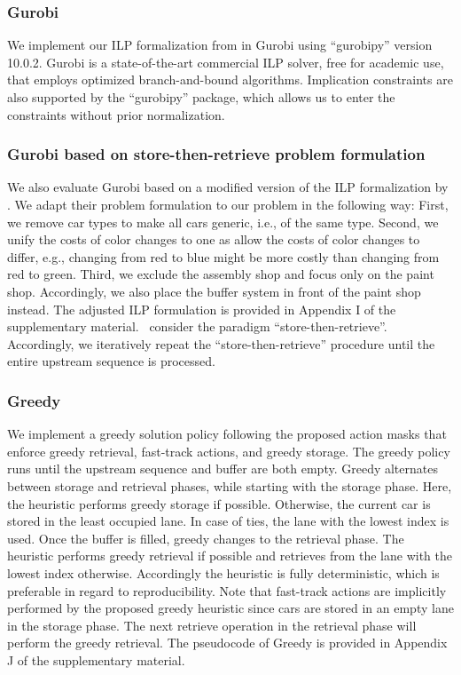 \documentclass[11pt]{elsarticle}
\begin{document}
\subsubsection*{Gurobi}

We implement our ILP formalization from  in Gurobi using ``gurobipy'' version 10.0.2.
Gurobi is a state-of-the-art commercial ILP solver, free for academic use, that employs optimized branch-and-bound algorithms. Implication constraints are also supported by the ``gurobipy'' package, which allows us to enter the constraints without prior normalization.


\subsubsection*{Gurobi based on store-then-retrieve problem formulation \citep{wu2021mathematical}}

We also evaluate Gurobi based on a modified version of the ILP formalization by \citet{wu2021mathematical}.  
We adapt their problem formulation to our problem in the following way: First, we remove car types to make all cars generic, i.e., of the same type. Second, we unify the costs of color changes to one as \citet{wu2021mathematical} allow the costs of color changes to differ, e.g., changing from red to blue might be more costly than changing from red to green. Third, we exclude the assembly shop and focus only on the paint shop.
Accordingly, we also place the buffer system in front of the paint shop instead. 
The adjusted ILP formulation is provided in Appendix I of the supplementary material. \citeauthor{wu2021mathematical}~consider the paradigm ``store-then-retrieve''. Accordingly, we iteratively repeat the ``store-then-retrieve'' procedure until the entire upstream sequence is processed.


\subsubsection*{Greedy}

We implement a greedy solution policy following the proposed action masks that enforce greedy retrieval, fast-track actions, and greedy storage. 
The greedy policy runs until the upstream sequence and buffer are both empty. Greedy alternates between storage and retrieval phases, while starting with the storage phase. Here, the heuristic performs greedy storage if possible. Otherwise, the current car is stored in the least occupied lane. In case of ties, the lane with the lowest index is used.  
Once the buffer is filled, greedy changes to the retrieval phase. The heuristic performs greedy retrieval if possible and retrieves from the lane with the lowest index otherwise. Accordingly the heuristic is fully deterministic, which is preferable in regard to reproducibility. Note that fast-track actions are implicitly performed by the proposed greedy heuristic since cars are stored in an empty lane in the storage phase. The next retrieve operation in the retrieval phase will perform the greedy retrieval. The pseudocode of Greedy is provided in Appendix J of the supplementary material.
\end{document}
